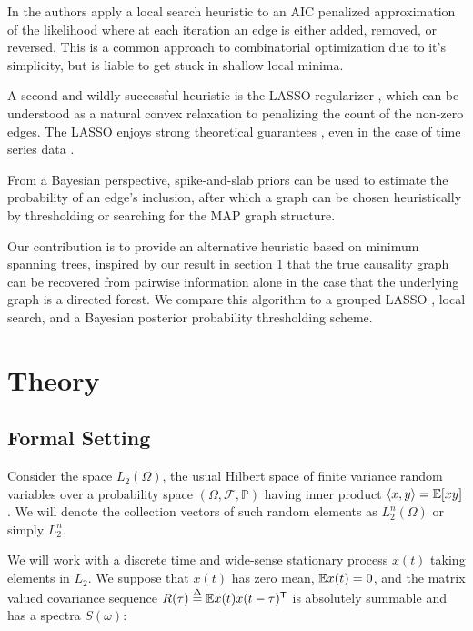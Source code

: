 \documentclass[12pt]{article}
\begin{document}
In \cite{bach2004learning} the authors apply a local search heuristic
to an AIC penalized approximation of the likelihood where at each
iteration an edge is either added, removed, or reversed.  This is a
common approach to combinatorial optimization due to it's simplicity,
but is liable to get stuck in shallow local minima.

A second and wildly successful heuristic is the LASSO regularizer
\cite{tibshirani1996regression}, which can be understood as a natural
convex relaxation to penalizing the count of the non-zero edges.  The
LASSO enjoys strong theoretical guarantees \cite{wainwright2009sharp},
even in the case of time series data \cite{basu2015}
\cite{wong2016lasso}.

From a Bayesian perspective, spike-and-slab priors can be used to
estimate the probability of an edge's inclusion, after which a graph
can be chosen heuristically by thresholding or searching for the MAP
graph structure.

Our contribution is to provide an alternative heuristic based on
minimum spanning trees, inspired by our result in section
\ref{sec:theory} that the true causality graph can be recovered from
pairwise information alone in the case that the underlying graph is a
directed forest.  We compare this algorithm to a grouped LASSO
\cite{yuan2006model}, local search, and a Bayesian posterior
probability thresholding scheme.


\section{Theory}
\label{sec:theory}
\subsection{Formal Setting}
Consider the space $L_2(\Omega)$, the usual Hilbert space of finite
variance random variables over a probability space
$(\Omega, \mathcal{F}, \mathbb{P})$ having inner product
$\langle x, y \rangle = \mathbb{E}[xy]$.  We will denote the collection vectors of
such random elements as $L_2^n(\Omega)$ or simply $L_2^n$.

We will work with a discrete time and wide-sense stationary process
$x(t)$ taking elements in $L_2$.  We suppose that $x(t)$ has zero
mean, $\mathbb{E} x(t) = 0$, and the matrix valued covariance sequence
$R(\tau) \overset{\Delta}{=} \mathbb{E} x(t)x(t - \tau)^{\mathsf{T}}$ is absolutely summable and has a spectra $S(\omega)$:
\end{document}
